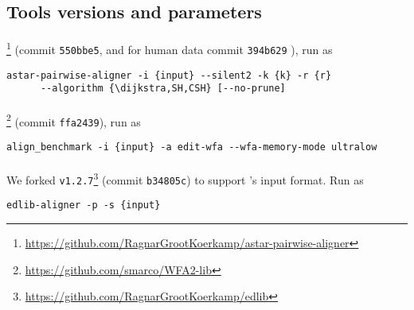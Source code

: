 \subsection{Tools versions and parameters}\label{GLOBALsec:app-tools}

\paragraph{\astarpa}\footnote{\url{https://github.com/RagnarGrootKoerkamp/astar-pairwise-aligner}}
(commit \texttt{550bbe5}, and for human data commit \texttt{394b629} ),
run as
\begin{Verbatim}[fontsize=\footnotesize]
  astar-pairwise-aligner -i {input} --silent2 -k {k} -r {r}
      --algorithm {\dijkstra,SH,CSH} [--no-prune]
\end{Verbatim}

\paragraph{\wfa}\footnote{\url{https://github.com/smarco/WFA2-lib}}
(commit \texttt{ffa2439}),
run as
\begin{Verbatim}[fontsize=\footnotesize]
  align_benchmark -i {input} -a edit-wfa --wfa-memory-mode ultralow
\end{Verbatim}

\paragraph{\edlib} We forked \texttt{v1.2.7}\footnote{\url{https://github.com/RagnarGrootKoerkamp/edlib}}
(commit \texttt{b34805c})
to support \oldwfa's input format. Run as
\begin{Verbatim}[fontsize=\footnotesize]
  edlib-aligner -p -s {input}
\end{Verbatim}
